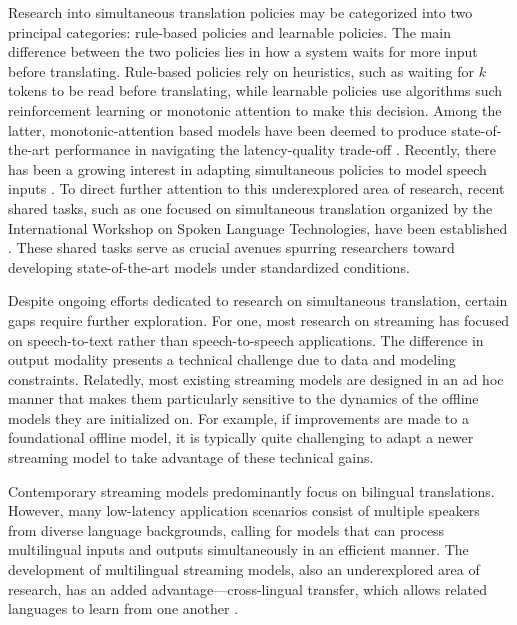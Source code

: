 Research into simultaneous translation policies may be categorized into two principal categories: rule-based policies \citep{cho2016can, dalvi_incremental_2018, ma_stacl_2019} and learnable policies.
The main difference between the two policies lies in how a system waits for more input before translating. Rule-based policies rely on heuristics, such as waiting for $k$ tokens to be read before translating, while learnable policies use algorithms such reinforcement  learning  \citep{gu_learning_2017} or monotonic attention to make this decision.
Among the latter, monotonic-attention based models have been deemed to produce state-of-the-art performance in navigating the latency-quality trade-off \citep{raffel_online_2017, chiu_monotonic_2018, arivazhagan_monotonic_2019, ma_monotonic_2019}.
Recently, there has been a growing interest in adapting simultaneous policies to model speech inputs
\citep{ren_simulspeech_2020,ma_simulmt_2020,ma_streaming_2020,wang_low_2020}.
To direct further attention to this underexplored area of research, recent shared tasks, such as one focused on simultaneous translation organized by the International Workshop on Spoken Language Technologies, have been established \citep{agrawal-etal-2023-findings, anastasopoulos-etal-2022-findings,anastasopoulos-etal-2021-findings,ansari-etal-2020-findings}. These shared tasks serve as crucial avenues spurring researchers toward developing state-of-the-art models under standardized conditions.

Despite ongoing efforts dedicated to research on simultaneous translation, certain gaps require further exploration. For one, most research on streaming has focused on speech-to-text rather than speech-to-speech applications. The difference in output modality presents a technical challenge due to data and modeling constraints. Relatedly, most existing streaming models are designed in an ad hoc manner that makes them particularly sensitive to the dynamics of the offline models they are initialized on. For example, if improvements are made to a foundational offline model, it is typically quite challenging to adapt a newer streaming model to take advantage of these technical gains.%

Contemporary streaming models predominantly focus on bilingual translations. However, many low-latency application scenarios consist of multiple speakers from diverse language backgrounds, calling for models that can process multilingual inputs and outputs simultaneously in an efficient manner. The development of multilingual streaming models, also an underexplored area of research, has an added advantage—cross-lingual transfer, which allows related languages to learn from one another \citep{nllb2022,nguyen2017transfer}.

